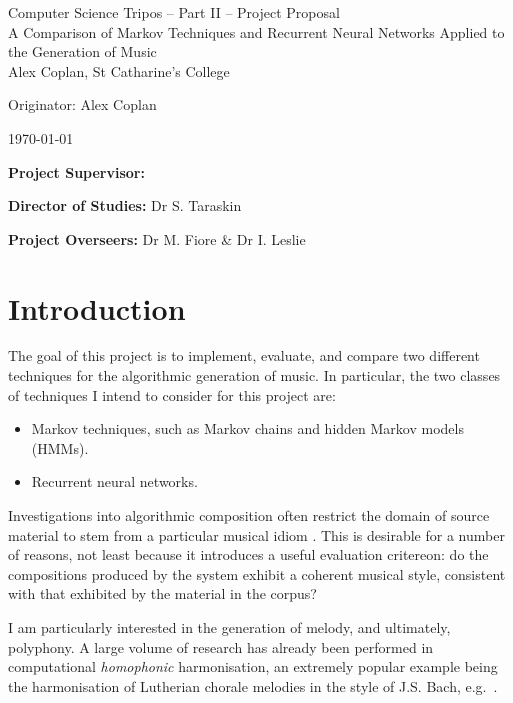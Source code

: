 \documentclass[12pt,a4paper,twoside]{article}
\begin{document}
\cleanlookdateon

\begin{center}
\Large
Computer Science Tripos -- Part II -- Project Proposal\\[4mm]
\LARGE
A Comparison of Markov Techniques and Recurrent Neural Networks Applied to the Generation of Music\\[4mm]

\large
Alex Coplan, St Catharine's College

Originator: Alex Coplan

\today
\end{center}

\vspace{5mm}

\textbf{Project Supervisor:} 

\textbf{Director of Studies:} Dr S. Taraskin

\textbf{Project Overseers:} Dr M. Fiore \& Dr I. Leslie


\section*{Introduction}

The goal of this project is to implement, evaluate, and compare two different techniques for the algorithmic generation of music. In particular, the two classes of techniques I intend to consider for this project are:
\begin{itemize}[itemsep=0mm]
	\item Markov techniques, such as Markov chains and hidden Markov models (HMMs).
	\item Recurrent neural networks.
\end{itemize}

Investigations into algorithmic composition often restrict the domain of source material to stem from a particular musical idiom \cite{pearce2001evaluation}. This is desirable for a number of reasons, not least because it introduces a useful evaluation critereon: do the compositions produced by the system exhibit a coherent musical style, consistent with that exhibited by the material in the corpus?

I am particularly interested in the generation of melody, and ultimately, polyphony. A large volume of research has already been performed in computational \emph{homophonic} harmonisation, an extremely popular example being the harmonisation of Lutherian chorale melodies in the style of J.S. Bach, e.g.\ \cite{allan2005chorales}\cite{phon2002computational}\cite{phon1999four}\cite{whorley2015improved}.
\end{document}
